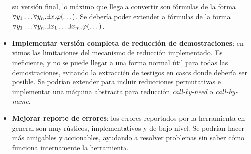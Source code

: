 \begin{itemize}
    su versión final, lo máximo que llega a convertir son fórmulas de la forma
    $\forall y_1 \dots \forall y_n . \exists x .
    \varphi(\dots)$. Se debería poder extender a fórmulas de la forma $\forall
    y_1 \dots \forall y_n . \exists x_1 \dots \exists x_m .
    \varphi(\dots)$.
    \item \textbf{Implementar versión completa de reducción de demostraciones}:
    en  vimos las limitaciones del mecanismo
    de reducción implementado. Es ineficiente, y no se puede llegar a una forma
    normal útil para todas las demostraciones, evitando la extracción de
    testigos en casos donde debería ser posible. Se podrían extender para
    incluir reducciones permutativas e implementar una máquina abstracta para
    reducción \textit{call-by-need} o \textit{call-by-name}.
    \item \textbf{Mejorar reporte de errores}: los errores reportados por la
    herramienta en general son muy rústicos, implementativos y de bajo nivel. Se
    podrían hacer más amigables y accionables, ayudando a resolver problemas sin
    saber cómo funciona internamente la herramienta.
\end{itemize}